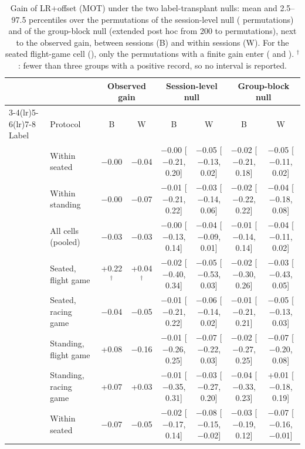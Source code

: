 \begin{table}[ht]
\centering
\scriptsize
\caption{Gain of LR+offset (MOT) under the two label-transplant nulls: mean and 2.5--97.5 percentiles over the permutations of the session-level null ( permutations) and of the group-block null (extended post hoc from 200 to  permutations), next to the observed gain, between sessions (B) and within sessions (W). For the seated flight-game cell (\sevtwo{}), only the permutations with a finite gain enter ( and ). $^\dagger$: fewer than three groups with a positive record, so no interval is reported.}
\label{tab:supp_nullranges}
\setlength{\tabcolsep}{3pt}
\begin{tabular}{@{}llcccccc@{}}
\toprule
 & & \multicolumn{2}{c}{Observed gain} & \multicolumn{2}{c}{Session-level null} & \multicolumn{2}{c}{Group-block null} \\
\cmidrule(lr){3-4}\cmidrule(lr){5-6}\cmidrule(lr){7-8}
Label & Protocol & B & W & B & W & B & W \\
\midrule
\sevtwo{} & Within seated & $-$0.00 & $-$0.04 & $-$0.00 [$-$0.21, 0.20] & $-$0.05 [$-$0.13, 0.02] & $-$0.02 [$-$0.21, 0.18] & $-$0.05 [$-$0.11, 0.02] \\
 & Within standing & $-$0.00 & $-$0.07 & $-$0.01 [$-$0.21, 0.22] & $-$0.03 [$-$0.14, 0.06] & $-$0.02 [$-$0.22, 0.22] & $-$0.04 [$-$0.18, 0.08] \\
 & All cells (pooled) & $-$0.03 & $-$0.03 & $-$0.00 [$-$0.13, 0.14] & $-$0.04 [$-$0.09, 0.01] & $-$0.01 [$-$0.14, 0.14] & $-$0.04 [$-$0.11, 0.02] \\
 & Seated, flight game & +0.22$^\dagger$ & +0.04$^\dagger$ & $-$0.02 [$-$0.40, 0.34] & $-$0.05 [$-$0.53, 0.03] & $-$0.02 [$-$0.30, 0.26] & $-$0.03 [$-$0.43, 0.05] \\
 & Seated, racing game & $-$0.04 & $-$0.05 & $-$0.01 [$-$0.21, 0.22] & $-$0.06 [$-$0.14, 0.02] & $-$0.01 [$-$0.21, 0.21] & $-$0.05 [$-$0.13, 0.03] \\
 & Standing, flight game & +0.08 & $-$0.16 & $-$0.01 [$-$0.26, 0.25] & $-$0.07 [$-$0.22, 0.03] & $-$0.02 [$-$0.27, 0.25] & $-$0.07 [$-$0.20, 0.08] \\
 & Standing, racing game & +0.07 & +0.03 & $-$0.01 [$-$0.35, 0.31] & $-$0.03 [$-$0.27, 0.20] & $-$0.04 [$-$0.33, 0.23] & +0.01 [$-$0.18, 0.19] \\
\midrule
\sevone{} & Within seated & $-$0.07 & $-$0.05 & $-$0.02 [$-$0.17, 0.14] & $-$0.08 [$-$0.15, $-$0.02] & $-$0.03 [$-$0.19, 0.12] & $-$0.07 [$-$0.16, $-$0.01] \\

\end{tabular}
\end{table}
